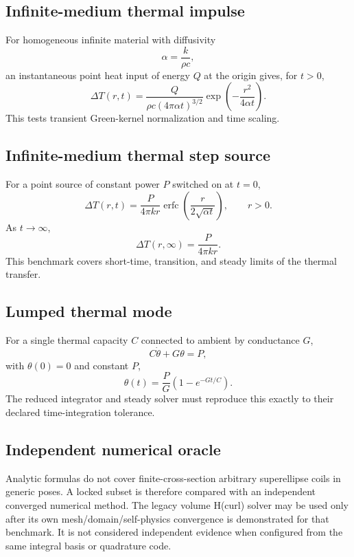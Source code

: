 \subsection{Infinite-medium thermal impulse}

For homogeneous infinite material with diffusivity
\[
  \alpha=\frac{k}{\rho c},
\]
an instantaneous point heat input of energy $Q$ at the origin gives, for $t>0$,
\[
 \Delta T(r,t)
 =
 \frac{Q}
      {\rho c(4\pi\alpha t)^{3/2}}
 \exp\left(
  -\frac{r^2}{4\alpha t}
 \right).
 \label{eq:thermal-impulse}
\]
This tests transient Green-kernel normalization and time scaling.

\subsection{Infinite-medium thermal step source}

For a point source of constant power $P$ switched on at $t=0$,
\[
  \Delta T(r,t)
  =
  \frac{P}{4\pi kr}
  \operatorname{erfc}
  \left(
    \frac{r}{2\sqrt{\alpha t}}
  \right),
  \qquad r>0.
  \label{eq:thermal-step}
\]
As $t\to\infty$,
\[
  \Delta T(r,\infty)=\frac{P}{4\pi kr}.
\]
This benchmark covers short-time, transition, and steady limits of the thermal
transfer.

\subsection{Lumped thermal mode}

For a single thermal capacity $C$ connected to ambient by conductance $G$,
\[
  C\dot\theta+G\theta=P,
\]
with $\theta(0)=0$ and constant $P$,
\[
 \theta(t)
 =
 \frac{P}{G}
 \left(
  1-e^{-Gt/C}
 \right).
 \label{eq:lumped-thermal}
\]
The reduced integrator and steady solver must reproduce this exactly to their
declared time-integration tolerance.

\subsection{Independent numerical oracle}

Analytic formulas do not cover finite-cross-section arbitrary superellipse
coils in generic poses. A locked subset is therefore compared with an
independent converged numerical method. The legacy volume H(curl) solver may be
used only after its own mesh/domain/self-physics convergence is demonstrated for
that benchmark. It is not considered independent evidence when configured from
the same integral basis or quadrature code.

